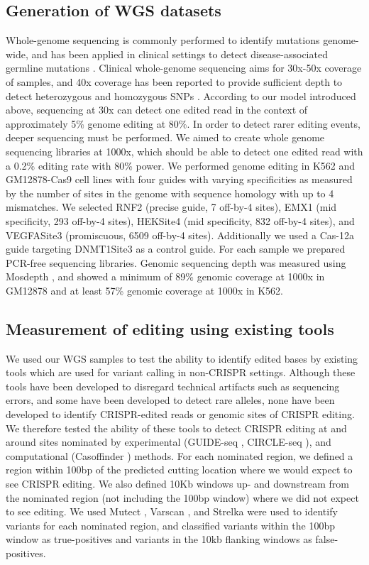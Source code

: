 \documentclass[a4paper, titlepage, openright]{book}
\begin{document}
\subsection{Generation of WGS datasets}
Whole-genome sequencing is commonly performed to identify mutations genome-wide, and has been applied in clinical settings to detect disease-associated germline mutations \citep{thiffault2019clinical}. Clinical whole-genome sequencing aims for 30x-50x coverage of samples, and 40x coverage has been reported to provide sufficient depth to detect heterozygous and homozygous SNPs \citep{sun2021characterizing}. According to our model introduced above, sequencing at 30x can detect one edited read in the context of approximately 5\% genome editing at 80\%. In order to detect rarer editing events, deeper sequencing must be performed. We aimed to create whole genome sequencing libraries at 1000x, which should be able to detect one edited read with a 0.2\% editing rate with 80\% power.  We performed genome editing in K562 and GM12878-Cas9 cell lines \citep{ma2017crispr} with four guides with varying specificities as measured by the number of sites in the genome with sequence homology with up to 4 mismatches. We selected RNF2 (precise guide, 7 off-by-4 sites), EMX1 (mid specificity, 293 off-by-4 sites), HEKSite4 (mid specificity, 832 off-by-4 sites), and VEGFASite3 (promiscuous, 6509 off-by-4 sites). Additionally we used a Cas-12a guide targeting DNMT1Site3 as a control guide. For each sample we prepared PCR-free sequencing libraries. Genomic sequencing depth was measured using Mosdepth \citep{pedersen2018mosdepth}, and showed a minimum of 89\% genomic coverage at 1000x in GM12878 and at least 57\% genomic coverage at 1000x in K562.
\subsection{Measurement of editing using existing tools}
We used our WGS samples to test the ability to identify edited bases by existing tools which are used for variant calling in non-CRISPR settings. Although these tools have been developed to disregard technical artifacts such as sequencing errors, and some have been developed to detect rare alleles, none have been developed to identify CRISPR-edited reads or genomic sites of CRISPR editing. We therefore tested the ability of these tools to detect CRISPR editing at and around sites nominated by experimental (GUIDE-seq \citep{tsai2015guide}, CIRCLE-seq \citep{tsai2017circle}), and computational (Casoffinder \citep{bae2014cas}) methods.  For each nominated region, we defined a region within 100bp of the predicted cutting location where we would expect to see CRISPR editing. We also defined 10Kb windows up- and downstream from the nominated region (not including the 100bp window) where we did not expect to see editing. We used Mutect \citep{mckenna2010genome}, Varscan \citep{koboldt2012varscan},  and Strelka \citep{kim2018strelka2} were used to identify variants for each nominated region, and classified variants within the 100bp window as true-positives and variants in the 10kb flanking windows as false-positives. 
\end{document}
